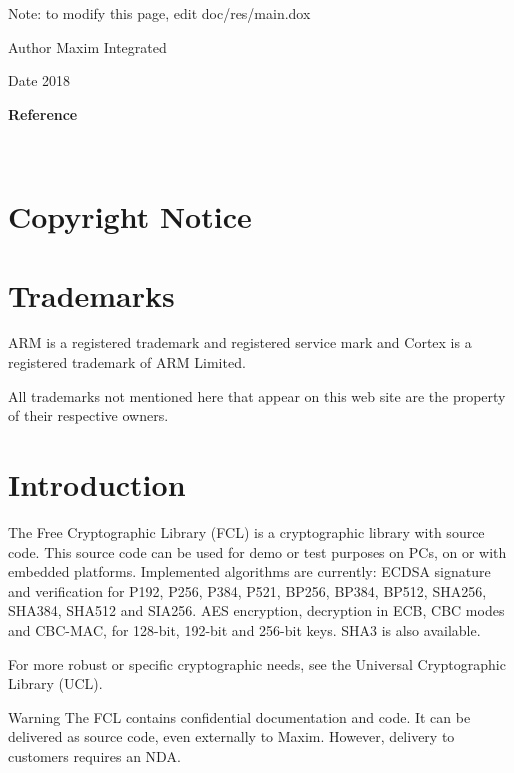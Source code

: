 Note\+: to modify this page, edit doc/res/main.\+dox

\begin{DoxyAuthor}{Author}
Maxim Integrated 
\end{DoxyAuthor}
\begin{DoxyDate}{Date}
2018
\end{DoxyDate}
{\bfseries Reference}

~~~~~~~~\hypertarget{index_s2}{}\section{Copyright Notice}\label{index_s2}

\begin{DoxyCode}
\end{DoxyCode}
 \hypertarget{index_trademarks}{}\section{Trademarks}\label{index_trademarks}

\begin{DoxyItemize}
\item A\+RM is a registered trademark and registered service mark and Cortex is a registered trademark of A\+RM Limited.
\item All trademarks not mentioned here that appear on this web site are the property of their respective owners.
\end{DoxyItemize}\hypertarget{index_Introduction}{}\section{Introduction}\label{index_Introduction}
The Free Cryptographic Library (F\+CL) is a cryptographic library with source code. This source code can be used for demo or test purposes on P\+Cs, on or with embedded platforms. Implemented algorithms are currently\+: E\+C\+D\+SA signature and verification for P192, P256, P384, P521, B\+P256, B\+P384, B\+P512, S\+H\+A256, S\+H\+A384, S\+H\+A512 and S\+I\+A256. A\+ES encryption, decryption in E\+CB, C\+BC modes and C\+B\+C-\/\+M\+AC, for 128-\/bit, 192-\/bit and 256-\/bit keys. S\+H\+A3 is also available.

For more robust or specific cryptographic needs, see the Universal Cryptographic Library (U\+CL).

\begin{DoxyWarning}{Warning}
The F\+CL contains confidential documentation and code. It can be delivered as source code, even externally to Maxim. However, delivery to customers requires an N\+DA.
\end{DoxyWarning}


